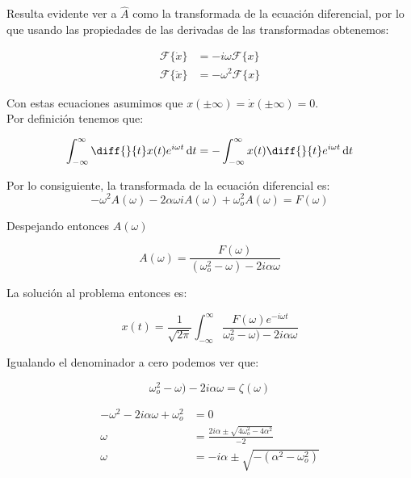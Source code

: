 \documentclass[11pt]{report}
\theoremstyle{plain}
\theoremstyle{definition}
\begin{document}
Resulta evidente ver a $\hat A$ como la transformada de la ecuación diferencial, por lo que usando las propiedades de las derivadas de las transformadas obtenemos:

\begin{align*}
	\mathcal{F}\lbrace \dot{x} \rbrace &= -i\omega \mathcal{F}\lbrace x \rbrace\\
	\mathcal{F}\lbrace \ddot{x} \rbrace &= -\omega^2 \mathcal{F}\lbrace x \rbrace
\end{align*}

Con estas ecuaciones asumimos que $x(\pm \infty) = \dot x (\pm \infty) = 0$.\\
Por definición tenemos que:

\begin{align*}
	\int_{-\infty}^\infty \diff{}{t} x(t) e^{i\omega t} \dd{t}= -\int_{-\infty}^\infty x(t) \diff{}{t} e^{i\omega t} \dd{t}\\
\end{align*}

Por lo consiguiente, la transformada de la ecuación diferencial es:
\begin{equation*}
	-\omega^2 A(\omega) -2\alpha\omega iA(\omega)+\omega^2_oA(\omega) = F(\omega)
\end{equation*}

Despejando entonces $A(\omega)$

\begin{equation*}
	A(\omega) = \frac{F(\omega)}{(\omega^2_o -\omega)-2i\alpha\omega}
\end{equation*}

La solución al problema entonces es:

\begin{equation*}
	x(t)=\frac{1}{\sqrt{2\pi}}\int_{-\infty}^\infty \frac{F(\omega)e^{-i\omega t}}{\omega^2_o -\omega)-2i\alpha\omega}
\end{equation*}

Igualando el denominador a cero podemos ver que:

\begin{equation*}
	\omega^2_o -\omega)-2i\alpha\omega = \zeta (\omega)
\end{equation*}

\begin{align*}
	-\omega^2 -2i\alpha\omega + \omega^2_o &=0\\
	\omega &= \frac{2i\alpha \pm\sqrt{4\omega^2_o - 4\alpha^2}}{-2}\\
	\omega &= -i\alpha \pm \sqrt{-(\alpha^2-\omega^2_o)}
\end{align*}
\end{document}
